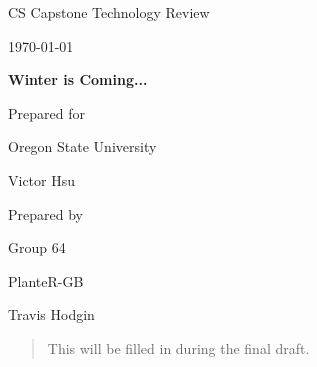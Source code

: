 \documentclass[onecolumn, draftclsnofoot,10pt, compsoc]{IEEEtran}
\def \CapstoneTeamName{			              			 PlanteR-GB}
\def \CapstoneTeamNumber{					           			 Group 64}
\def \GroupMemberOne{				           				Travis Hodgin}
\def \GroupMemberTwo{				           				Austin Hodgin}
\def \GroupMemberThree{			            Maximillian Schmidt}
\def\GroupMemberFour{		        	               Zach Lerew}
\def \CapstoneProjectName{	      	    Winter is Coming...}
\def \CapstoneSponsorCompany{		    Oregon State University}
\def \CapstoneSponsorPerson{		 			  				 Victor Hsu}
\def \DocType{		%
				Technology Review
				}
\newcommand{\NameSigPair}[1]{\par
\makebox[2.75in][r]{#1} \hfil 	\makebox[3.25in]{\makebox[2.25in]{\hrulefill} \hfill		\makebox[.75in]{\hrulefill}}
\par\vspace{-12pt} \textit{\tiny\noindent
\makebox[2.75in]{} \hfil		\makebox[3.25in]{\makebox[2.25in][r]{Signature} \hfill	\makebox[.75in][r]{Date}}}}
\renewcommand{\NameSigPair}[1]{#1}
\begin{document}
\begin{titlepage}
    \begin{singlespace}
        \hfill


        \par\vspace{.2in}
        \centering
        \scshape{
            \huge CS Capstone \DocType \par
            {\large\today}\par
            \vspace{.5in}
            \textbf{\Huge\CapstoneProjectName}\par

						\vspace{1in}

            {\large Prepared for}\par
            \Huge \CapstoneSponsorCompany\par
            \vspace{5pt}
            {\Large\NameSigPair{\CapstoneSponsorPerson}\par}

						\vspace{1in}

            {\large Prepared by}\par
						{\huge \CapstoneTeamNumber}\par
            \CapstoneTeamName\par
            \vspace{5pt}

            {
							\Large
							\NameSigPair{\GroupMemberOne}\par
            }

            \vspace{20pt}
        }
				\newpage
        \begin{abstract}
					This will be filled in during the final draft.
        \end{abstract}
    \end{singlespace}
\end{titlepage}
\end{document}
